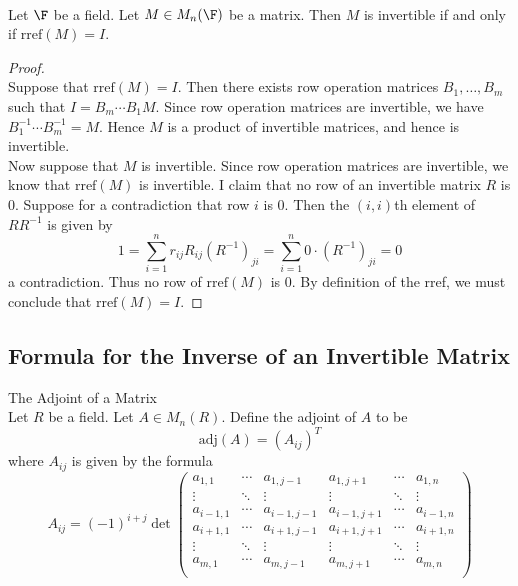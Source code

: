 \documentclass[a4paper]{article}
\begin{document}
\begin{prp}{}{}\\
Let $\F$ be a field. Let $M\in M_n(\F)$ be a matrix. Then $M$ is invertible if and only if $\text{rref}(M)=I$. 
\begin{proof}\\
Suppose that $\text{rref}(M)=I$. Then there exists row operation matrices $B_1,\dots,B_m$ such that $I=B_m\cdots B_1M$. Since row operation matrices are invertible, we have $B_1^{-1}\cdots B_m^{-1}=M$. Hence $M$ is a product of invertible matrices, and hence is invertible. \\

Now suppose that $M$ is invertible. Since row operation matrices are invertible, we know that $\text{rref}(M)$ is invertible. I claim that no row of an invertible matrix $R$ is $0$. Suppose for a contradiction that row $i$ is $0$. Then the $(i,i)$th element of $RR^{-1}$ is given by $$1=\sum_{i=1}^nr_{ij}R_{ij}(R^{-1})_{ji}=\sum_{i=1}^n0\cdot(R^{-1})_{ji}=0$$ a contradiction. Thus no row of $\text{rref}(M)$ is $0$. By definition of the rref, we must conclude that $\text{rref}(M)=I$. 
\end{proof}
\end{prp}

\subsection{Formula for the Inverse of an Invertible Matrix}
\begin{defn}{The Adjoint of a Matrix}{}\\
Let $R$ be a field. Let $A\in M_n(R)$. Define the adjoint of $A$ to be $$\text{adj}(A)=(A_{ij})^T$$ where $A_{ij}$ is given by the formula $$A_{ij}=(-1)^{i+j}\det\begin{pmatrix}
a_{1,1} & \cdots & a_{1,j-1} & a_{1,j+1} & \cdots & a_{1,n}\\
\vdots & \ddots & \vdots & \vdots & \ddots & \vdots\\
a_{i-1,1} & \cdots & a_{i-1,j-1} & a_{i-1,j+1} & \cdots & a_{i-1,n}\\
a_{i+1,1} & \cdots & a_{i+1,j-1} & a_{i+1,j+1} & \cdots & a_{i+1,n}\\
\vdots & \ddots & \vdots & \vdots & \ddots & \vdots\\
a_{m,1} & \cdots & a_{m,j-1} & a_{m,j+1} & \cdots & a_{m,n}\\
\end{pmatrix}$$
\end{defn}
\end{document}
